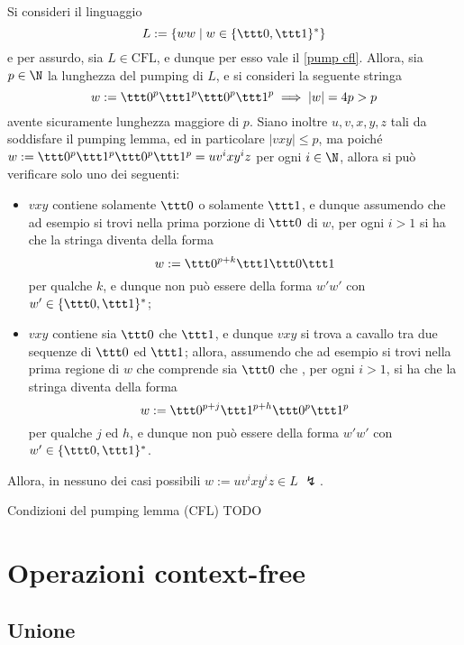 \documentclass[a4paper, 12pt]{report}
\begin{document}
    \begin{example}
        \label{pump cfl ex2}
        Si consideri il linguaggio $$L := \{ww \mid w \in \{\ttt 0, \ttt 1\}^*\}$$ e per assurdo, sia $L \in \mathrm{CFL}$, e dunque per esso vale il \cref{pump cfl}. Allora, sia $p \in \N$ la lunghezza del pumping di $L$, e si consideri la seguente stringa $$w := \ttt 0 ^p \ttt 1 ^p \ttt 0 ^p \ttt 1 ^p \implies |w| = 4p > p$$ avente sicuramente lunghezza maggiore di $p$. Siano inoltre $u, v, x, y, z$ tali da soddisfare il pumping lemma, ed in particolare $|vxy| \le p$, ma poiché $w := \ttt 0^p \ttt 1^p \ttt 0^p \ttt 1^p = uv^ixy^iz$ per ogni $i \in \N$, allora si può verificare solo uno dei seguenti:

        \begin{itemize}
            \item $vxy$ contiene solamente $\ttt 0$ o solamente $\ttt 1$, e dunque assumendo che ad esempio si trovi nella prima porzione di $\ttt 0$ di $w$, per ogni $i > 1$ si ha che la stringa diventa della forma $$w := \ttt 0 ^{p + k} \ttt 1 \ttt 0 \ttt 1$$ per qualche $k$, e dunque non può essere della forma $w'w'$ con $w' \in \{\ttt 0, \ttt1\}^*$;
            \item $vxy$ contiene sia $\ttt 0$ che $\ttt 1$, e dunque $vxy$ si trova a cavallo tra due sequenze di $\ttt 0$ ed $\ttt 1$; allora, assumendo che ad esempio si trovi nella prima regione di $w$ che comprende sia $\ttt 0$ che , per ogni $i > 1$, si ha che la stringa diventa della forma $$w := \ttt 0 ^{p + j} \ttt 1 ^{p + h} \ttt 0 ^p \ttt 1 ^ p$$ per qualche $j$ ed $h$, e dunque non può essere della forma $w'w'$ con $w' \in \{\ttt 0, \ttt 1\}^*$.
        \end{itemize}
        
        Allora, in nessuno dei casi possibili $w := u v^i x y^i z \in L$ $\lightning$.
    \end{example}

    \begin{framedobs}{Condizioni del pumping lemma (CFL)}
        TODO
    \end{framedobs}

    \section{Operazioni context-free}

    \subsection{Unione}
\end{document}
